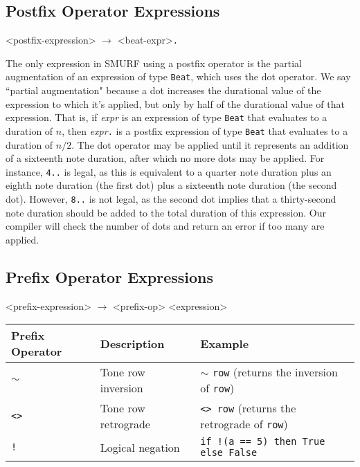 \subsection{Postfix Operator Expressions}
\label{sec:postfix}

\begin{grammar}
<postfix-expression> $\rightarrow$ <beat-expr>\texttt{.}
\end{grammar}

The only expression in SMURF using a postfix operator is the partial augmentation of an expression
of type \texttt{Beat}, which uses the dot operator.
We say ``partial augmentation" because a dot increases the durational value of
the expression to which it's applied, but only by half of the durational value of that expression.
That is, if \emph{expr} is an expression of type \texttt{Beat} that evaluates to a duration of $n$, 
then \emph{expr}\texttt{.} is a postfix expression of type \texttt{Beat} 
that evaluates to a duration of $n/2$.
The dot operator may be applied until it represents an addition of a sixteenth note
duration, after which no more dots may be applied. For instance, \texttt{4..} is legal, as this
is equivalent to a quarter note duration plus an eighth note duration (the first dot) plus a
sixteenth note duration (the second dot). However, \texttt{8..} is not legal, as the second
dot implies that a thirty-second note duration should be added to the total duration of this
expression. Our compiler will check the number of dots and return an error if too many are applied.

\subsection{Prefix Operator Expressions}

\begin{grammar}
<prefix-expression> $\rightarrow$ <prefix-op> <expression>
\end{grammar}


\begin{table} [H]
\centering
\begin{tabularx}{0.9\textwidth}{llX}
\hline\hline
Prefix Operator & Description & Example \\
\hline\hline
   \texttt{$\sim$} & Tone row inversion & $\sim$ \texttt{row} (returns the inversion of \texttt{row})\\ \hline
   \texttt{<>} & Tone row retrograde & \texttt{<>}~\texttt{row} (returns the
           retrograde of \texttt{row})\\ \hline
   \texttt{!} & Logical negation & \texttt{if !(a == 5) then True else False} \\ \hline
\end{tabularx}
\end{table}

